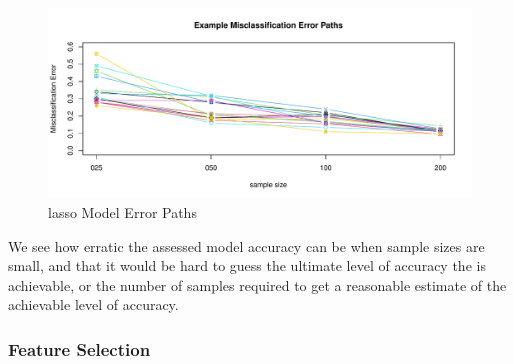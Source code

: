 \documentclass[
]{book}
\begin{document}
\begin{figure}
\centering
\includegraphics{Static/figures/hcc5hmC-glmnetSuite-lasso-simRes-errorsPath-overSim-1.pdf}
\caption{\label{fig:hcc5hmC-glmnetSuite-lasso-simRes-errorsPath-overSim}lasso Model Error Paths}
\end{figure}

We see how erratic the assessed model accuracy can be when sample sizes are small,
and that it would be hard to guess the ultimate level of accuracy the
is achievable, or the number of samples required to get a reasonable
estimate of the achievable level of accuracy.

\hypertarget{feature-selection-1}{%
\subsubsection{Feature Selection}\label{feature-selection-1}}
\end{document}

